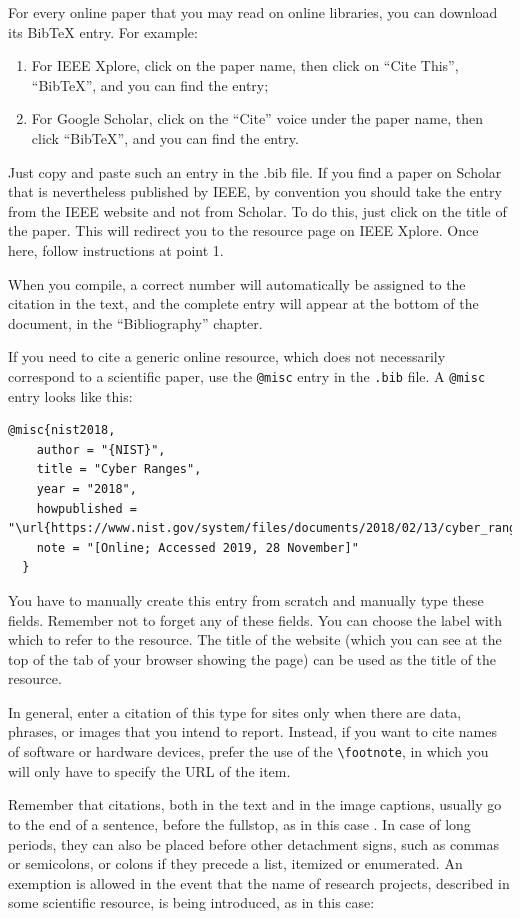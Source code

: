 For every online paper that you may read on online libraries, you can download its BibTeX entry. For example:
\begin{enumerate}
	\item For IEEE Xplore, click on the paper name, then click on ``Cite This'', ``BibTeX'', and you can find the entry;
	\item For Google Scholar, click on the ``Cite'' voice under the paper name, then click ``BibTeX'', and you can find the entry. 
\end{enumerate}

Just copy and paste such an entry in the .bib file. If you find a paper on Scholar that is nevertheless published by IEEE, by convention you should take the entry from the IEEE website and not from Scholar. To do this, just click on the title of the paper. This will redirect you to the resource page on IEEE Xplore. Once here, follow instructions at point 1.

When you compile, a correct number will automatically be assigned to the citation in the text, and the complete entry will appear at the bottom of the document, in the ``Bibliography'' chapter. 

If you need to cite a generic online resource, which does not necessarily correspond to a scientific paper, use the \lstinline{@misc} entry in the \texttt{.bib} file. A \lstinline{@misc} entry looks like this:

\begin{verbatim}
@misc{nist2018,
    author = "{NIST}",
    title = "Cyber Ranges",
    year = "2018",
    howpublished = "\url{https://www.nist.gov/system/files/documents/2018/02/13/cyber_ranges.pdf}",
    note = "[Online; Accessed 2019, 28 November]"
  }
\end{verbatim}

You have to manually create this entry from scratch and manually type these fields. Remember not to forget any of these fields. You can choose the label with which to refer to the resource. The title of the website (which you can see at the top of the tab of your browser showing the page) can be used as the title of the resource.

In general, enter a citation of this type for sites only when there are data, phrases, or images that you intend to report. Instead, if you want to cite names of software or hardware devices, prefer the use of the \lstinline{\footnote}, in which you will only have to specify the URL of the item. 

Remember that citations, both in the text and in the image captions, usually go to the end of a sentence, before the fullstop, as in this case \cite{vykopal2017kypo}. In case of long periods, they can also be placed before other detachment signs, such as commas or semicolons, or colons if they precede a list, itemized or enumerated. An exemption is allowed in the event that the name of research projects, described in some scientific resource, is being introduced, as in this case:

